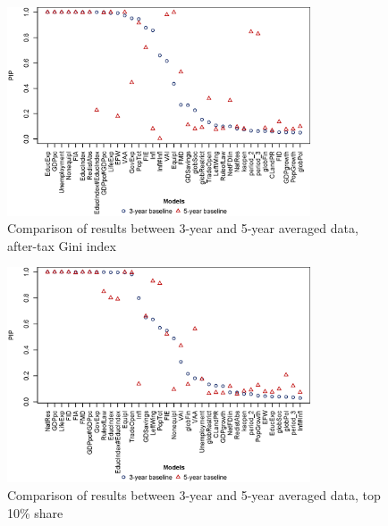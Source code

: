 \begin{enumerate}[resume]
    \begin{figure}[ht!]
      \caption{Comparison of results between 3-year and 5-year averaged data, after-tax Gini index}
      \label{ch4fig:comp_3y5y_gini}
      \centering
      \includegraphics[width=0.8\textwidth, keepaspectratio]{Figures/ch4/comp_3y5y_gini}
    \end{figure}
\clearpage
    \begin{figure}[ht!]
      \caption{Comparison of results between 3-year and 5-year averaged data, top 10\% share}
      \label{ch4fig:comp_3y5y_top10}
      \centering
      \includegraphics[width=0.8\textwidth, keepaspectratio]{Figures/ch4/comp_3y5y_top10}
    \end{figure}


\end{enumerate}
